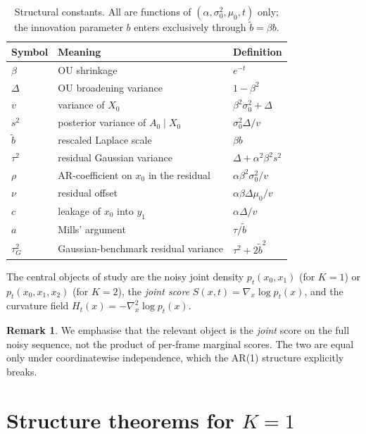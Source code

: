 \documentclass[11pt,a4paper]{article}
\theoremstyle{plainserif}
\theoremstyle{definition}
\theoremstyle{remarkstyle}
\newtheorem*{remark}{Remark}
\newcommand{\btilde}{\tilde{b}}
\begin{document}
\begin{table}[h]
\centering
\small
\begin{tabular}{lll}
\hline
Symbol & Meaning & Definition \\ \hline
$\beta$          & OU shrinkage & $e^{-t}$ \\
$\Delta$         & OU broadening variance & $1-\beta^2$ \\
$v$              & variance of $X_0$ & $\beta^2\sigma_0^2 + \Delta$ \\
$s^2$            & posterior variance of $A_0\mid X_0$ & $\sigma_0^2\Delta/v$ \\
$\btilde$        & rescaled Laplace scale & $\beta b$ \\
$\tau^2$         & residual Gaussian variance & $\Delta + \alpha^2 \beta^2 s^2$ \\
$\rho$           & AR-coefficient on $x_0$ in the residual & $\alpha\beta^2\sigma_0^2/v$ \\
$\nu$            & residual offset & $\alpha\beta\Delta\mu_0/v$ \\
$c$              & leakage of $x_0$ into $y_1$ & $\alpha\Delta/v$ \\
$a$              & Mills' argument & $\tau/\btilde$ \\
$\tau_G^2$       & Gaussian-benchmark residual variance & $\tau^2 + 2\btilde^2$ \\
\hline
\end{tabular}
\caption{Structural constants. All are functions of $(\alpha,\sigma_0^2,\mu_0,t)$
only; the innovation parameter $b$ enters exclusively through $\btilde = \beta b$.}
\label{tab:constants}
\end{table}

The central objects of study are the noisy joint density $p_t(x_0,x_1)$
(for $K=1$) or $p_t(x_0,x_1,x_2)$ (for $K=2$), the \emph{joint score}
$S(x,t) = \nabla_x \log p_t(x)$, and the curvature field
$H_t(x) = -\nabla^2_x \log p_t(x)$.

\begin{remark}
We emphasise that the relevant object is the \emph{joint} score on the
full noisy sequence, not the product of per-frame marginal scores.
The two are equal only under coordinatewise independence, which the
AR(1) structure explicitly breaks.
\end{remark}

\section{Structure theorems for $K=1$}
\end{document}
